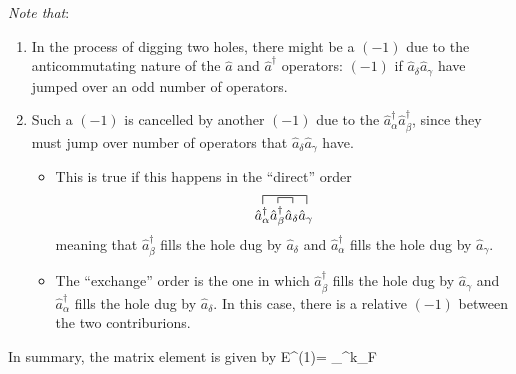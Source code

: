 \documentclass[12pt]{article}
\begin{document}
\emph{Note that}:
\begin{enumerate}
\item In the process of digging two holes, there might
be a $(-1)$ due to the anticommutating nature
of the $\hat{a}$ and $\hat{a}^{\dagger}$ operators:
\be
{}
\ee
$(-1)$ if $\hat{a}_{\delta} \hat{a}_{\gamma}$ have jumped over an
odd number of operators.
%
\item Such a $(-1)$ is cancelled by another $(-1)$
due to the $\hat{a}_{\alpha}^{\dagger} \hat{a}_{\beta}^{\dagger}$, since they must jump
over number of operators that $\hat{a}_{\delta} \hat{a}_{\gamma}$ have.
\begin{itemize}
\item This is true if this happens in the
``direct'' order
\[
\contraction[1.5ex]{}%
{\hat{a}_{\alpha}^{\dagger}}%
{\hat{a}_{\beta}^{\dagger}\hat{a}_{\delta}}%
{\hat{a}_{\gamma}}%
\contraction%
{\hat{a}_{\alpha}^{\dagger}}%
{\hat{a}_{\beta}^{\dagger}}{}{\hat{a}_{\delta}}%
{\hat{a}_{\alpha}^{\dagger}}%
{\hat{a}_{\beta}^{\dagger}\hat{a}_{\delta}}%
{\hat{a}_{\gamma}}
\]
meaning that
$\hat{a}^\dagger_{\beta}$ fills the hole dug by $\hat{a}_{\delta}$ and
$\hat{a}^\dagger_{\alpha}$ fills the hole dug by $\hat{a}_{\gamma}$.
\item The ``exchange'' order is the one in which
$\hat{a}^\dagger_{\beta}$ fills the hole dug by $\hat{a}_{\gamma}$ and
$\hat{a}^\dagger_{\alpha}$ fills the hole dug by $\hat{a}_{\delta}$.
In this case, there is a relative
$(-1)$ between the two contriburions.
\end{itemize}
\end{enumerate}
In summary, the matrix element is given by
\be
E^{(1)}= \sum_{\alpha \beta}^{k_{F}}
\ee
\end{document}
